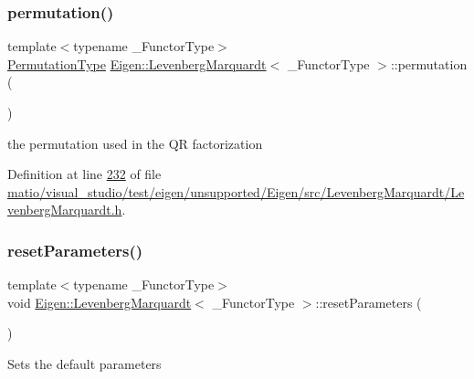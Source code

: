 \subsubsection{\texorpdfstring{permutation()}{permutation()}\hspace{0.1cm}{\footnotesize\ttfamily [2/2]}}
{\footnotesize\ttfamily template$<$typename \+\_\+\+Functor\+Type$>$ \\
\hyperlink{group___core___module}{Permutation\+Type} \hyperlink{class_eigen_1_1_levenberg_marquardt}{Eigen\+::\+Levenberg\+Marquardt}$<$ \+\_\+\+Functor\+Type $>$\+::permutation (\begin{DoxyParamCaption}{ }\end{DoxyParamCaption})\hspace{0.3cm}{\ttfamily [inline]}}

the permutation used in the QR factorization 

Definition at line \hyperlink{matio_2visual__studio_2test_2eigen_2unsupported_2_eigen_2src_2_levenberg_marquardt_2_levenberg_marquardt_8h_source_l00232}{232} of file \hyperlink{matio_2visual__studio_2test_2eigen_2unsupported_2_eigen_2src_2_levenberg_marquardt_2_levenberg_marquardt_8h_source}{matio/visual\+\_\+studio/test/eigen/unsupported/\+Eigen/src/\+Levenberg\+Marquardt/\+Levenberg\+Marquardt.\+h}.

\mbox{\label{class_eigen_1_1_levenberg_marquardt_a16172a2048058ea0a908213a7b0f8971}} 
\subsubsection{\texorpdfstring{reset\+Parameters()}{resetParameters()}\hspace{0.1cm}{\footnotesize\ttfamily [1/2]}}
{\footnotesize\ttfamily template$<$typename \+\_\+\+Functor\+Type$>$ \\
void \hyperlink{class_eigen_1_1_levenberg_marquardt}{Eigen\+::\+Levenberg\+Marquardt}$<$ \+\_\+\+Functor\+Type $>$\+::reset\+Parameters (\begin{DoxyParamCaption}{ }\end{DoxyParamCaption})\hspace{0.3cm}{\ttfamily [inline]}}

Sets the default parameters 

